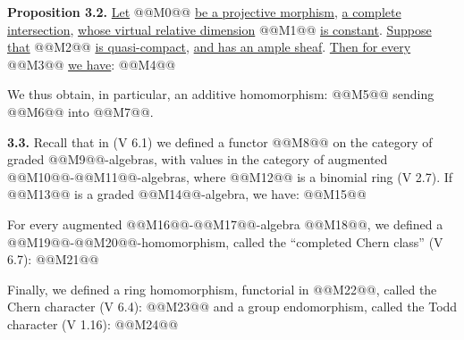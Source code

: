 \textbf{Proposition 3.2.} \uline{Let} @@M0@@ \uline{be a projective morphism}, \uline{a complete intersection}, \uline{whose virtual relative dimension} @@M1@@ \uline{is constant}. \uline{Suppose that} @@M2@@ \uline{is quasi-compact}, \uline{and has an ample sheaf}. \uline{Then for every} @@M3@@ \uline{we have}:
@@M4@@

We thus obtain, in particular, an additive homomorphism:
@@M5@@
sending @@M6@@ into @@M7@@.

\textbf{3.3.} Recall that in (V 6.1) we defined a functor @@M8@@ on the category of graded @@M9@@-algebras, with values in the category of augmented @@M10@@-@@M11@@-algebras, where @@M12@@ is a binomial ring (V 2.7). If @@M13@@ is a graded @@M14@@-algebra, we have:
@@M15@@

For every augmented @@M16@@-@@M17@@-algebra @@M18@@, we defined a @@M19@@-@@M20@@-homomorphism, called the ``completed Chern class'' (V 6.7):
@@M21@@

Finally, we defined a ring homomorphism, functorial in @@M22@@, called the Chern character (V 6.4):
@@M23@@
and a group endomorphism, called the Todd character (V 1.16):
@@M24@@
